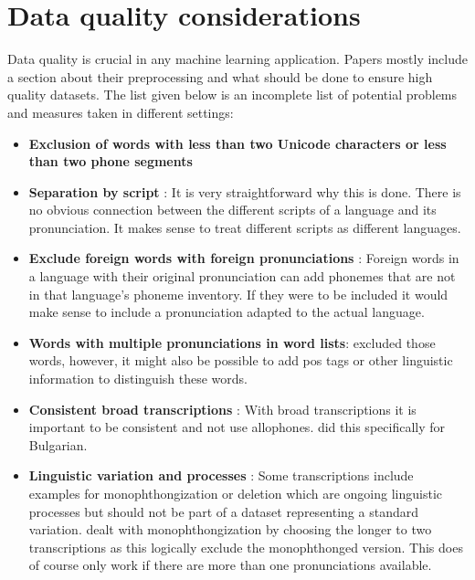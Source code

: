 \section{Data quality considerations}
\label{data_qual}
Data quality is crucial in any machine learning application. Papers mostly include a section about their preprocessing and what should be done to ensure high quality datasets. The list given below is an incomplete list of potential problems and measures taken in different settings:

\begin{itemize}
\item \textbf{Exclusion of words with less than two Unicode characters or less than two phone segments} \citep{Ashby&Bartley.2021} 
\item \textbf{Separation by script} \citep{Ashby&Bartley.2021}: It is very straightforward why this is done. There is no obvious connection between the different scripts of a language and its pronunciation. It makes sense to treat different scripts as different languages. 
\item \textbf{Exclude foreign words with foreign pronunciations} \citep{Ashby&Bartley.2021}: Foreign words in a language with their original pronunciation can add phonemes that are not in that language's phoneme inventory. If they were to be included it would make sense to include a pronunciation adapted to the actual language.
\item \textbf{Words with multiple pronunciations in word lists}: \cite{Ashby&Bartley.2021} excluded those words, however, it might also be possible to add \ac{pos} tags or other linguistic information to distinguish these words.
\item \textbf{Consistent broad transcriptions} \citep{Ashby&Bartley.2021}: With broad transcriptions it is important to be consistent and not use allophones. \cite{Ashby&Bartley.2021} did this specifically for Bulgarian.
\item \textbf{Linguistic variation and processes} \citep{Ashby&Bartley.2021}: Some transcriptions include examples for monophthongization or deletion which are ongoing linguistic processes but should not be part of a dataset representing a standard variation. \cite{Ashby&Bartley.2021} dealt with monophthongization by choosing the longer to two transcriptions as this logically exclude the monophthonged version. This does of course only work if there are more than one pronunciations available. 

\end{itemize}
